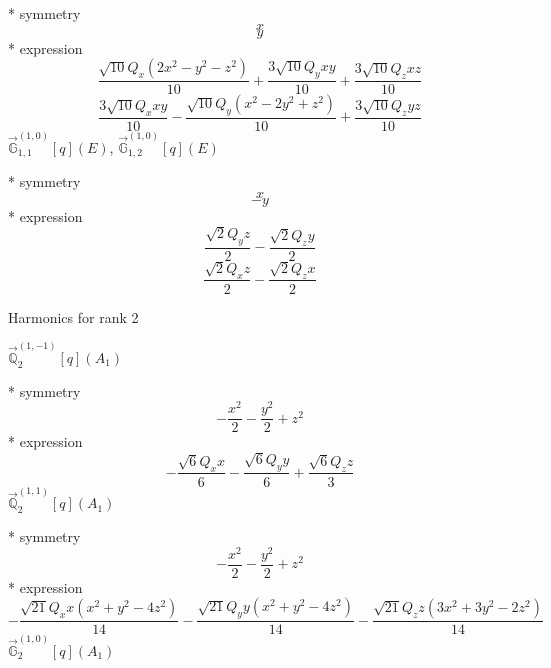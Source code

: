 \documentclass[fleqn,8pt]{jsarticle}
\begin{document}
\noindent\quad ** symmetry
\begin{dmath*}
x
\end{dmath*}
\begin{dmath*}
y
\end{dmath*}
\noindent\quad ** expression
\begin{dmath*}
\frac{\sqrt{10} Q_{x} \left(2 x^{2} - y^{2} - z^{2}\right)}{10} + \frac{3 \sqrt{10} Q_{y} x y}{10} + \frac{3 \sqrt{10} Q_{z} x z}{10}
\end{dmath*}
\begin{dmath*}
\frac{3 \sqrt{10} Q_{x} x y}{10} - \frac{\sqrt{10} Q_{y} \left(x^{2} - 2 y^{2} + z^{2}\right)}{10} + \frac{3 \sqrt{10} Q_{z} y z}{10}
\end{dmath*}
\noindent\quad $\vec{\mathbb{G}}_{1,1}^{(1,0)}[q](E)$, $\vec{\mathbb{G}}_{1,2}^{(1,0)}[q](E)$

\noindent\quad ** symmetry
\begin{dmath*}
x
\end{dmath*}
\begin{dmath*}
- y
\end{dmath*}
\noindent\quad ** expression
\begin{dmath*}
\frac{\sqrt{2} Q_{y} z}{2} - \frac{\sqrt{2} Q_{z} y}{2}
\end{dmath*}
\begin{dmath*}
\frac{\sqrt{2} Q_{x} z}{2} - \frac{\sqrt{2} Q_{z} x}{2}
\end{dmath*}

\noindent * Harmonics for rank 2

\noindent\quad $\vec{\mathbb{Q}}_{2}^{(1,-1)}[q](A_{1})$

\noindent\quad ** symmetry
\begin{dmath*}
- \frac{x^{2}}{2} - \frac{y^{2}}{2} + z^{2}
\end{dmath*}
\noindent\quad ** expression
\begin{dmath*}
- \frac{\sqrt{6} Q_{x} x}{6} - \frac{\sqrt{6} Q_{y} y}{6} + \frac{\sqrt{6} Q_{z} z}{3}
\end{dmath*}
\noindent\quad $\vec{\mathbb{Q}}_{2}^{(1,1)}[q](A_{1})$

\noindent\quad ** symmetry
\begin{dmath*}
- \frac{x^{2}}{2} - \frac{y^{2}}{2} + z^{2}
\end{dmath*}
\noindent\quad ** expression
\begin{dmath*}
- \frac{\sqrt{21} Q_{x} x \left(x^{2} + y^{2} - 4 z^{2}\right)}{14} - \frac{\sqrt{21} Q_{y} y \left(x^{2} + y^{2} - 4 z^{2}\right)}{14} - \frac{\sqrt{21} Q_{z} z \left(3 x^{2} + 3 y^{2} - 2 z^{2}\right)}{14}
\end{dmath*}
\noindent\quad $\vec{\mathbb{G}}_{2}^{(1,0)}[q](A_{1})$
\end{document}
